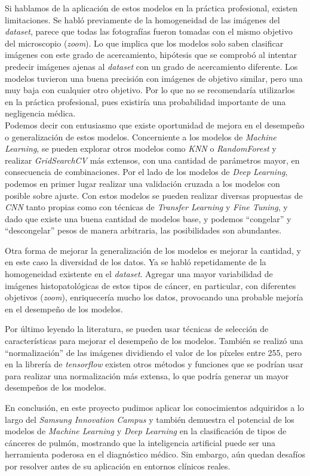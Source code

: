 Si hablamos de la aplicación de estos modelos en la práctica profesional, existen limitaciones. Se habló previamente de la homogeneidad de las imágenes del \textit{dataset}, parece que todas las fotografías fueron tomadas con el mismo objetivo del microscopio (\textit{zoom}). Lo que implica que los modelos solo saben clasificar imágenes con este grado de acercamiento, hipótesis que se comprobó al intentar predecir imágenes ajenas al \textit{dataset} con un grado de acercamiento diferente. Los modelos tuvieron una buena precisión con imágenes de objetivo similar, pero una muy baja con cualquier otro objetivo. Por lo que no se recomendaría utilizarlos en la práctica profesional, pues existiría una probabilidad importante de una negligencia médica. \\

Podemos decir con entusiasmo que existe oportunidad de mejora en el desempeño o generalización de estos modelos. Concerniente a los modelos de \textit{Machine Learning}, se pueden explorar otros modelos como \textit{KNN} o \textit{RandomForest} y realizar \textit{GridSearchCV} más extensos, con una cantidad de parámetros mayor, en consecuencia de combinaciones. Por el lado de los modelos de \textit{Deep Learning}, podemos en primer lugar realizar una validación cruzada a los modelos con posible sobre ajuste. Con estos modelos se pueden realizar diversas propuestas de \textit{CNN} tanto propias como con técnicas de \textit{Transfer Learning} y \textit{Fine Tuning}, y dado que existe una buena cantidad de modelos base, y podemos ``congelar'' y ``descongelar'' pesos de manera arbitraria, las posibilidades son abundantes.

Otra forma de mejorar la generalización de los modelos es mejorar la cantidad, y en este caso la diversidad de los datos. Ya se habló repetidamente de la homogeneidad existente en el \textit{dataset}. Agregar una mayor variabilidad de imágenes histopatológicas de estos tipos de cáncer, en particular, con diferentes objetivos (\textit{zoom}), enriquecería mucho los datos, provocando una probable mejoría en el desempeño de los modelos. 

Por último leyendo la literatura, se pueden usar técnicas de selección de características para mejorar el desempeño de los modelos. También se realizó una ``normalización'' de las imágenes dividiendo el valor de los píxeles entre 255, pero en la librería de \textit{tensorflow} existen otros métodos y funciones que se podrían usar para realizar una normalización más extensa, lo que podría generar un mayor desempeños de los modelos. \\

\newpage

En conclusión, en este proyecto pudimos aplicar los conocimientos adquiridos a lo largo del \textit{Samsung Innovation Campus} y también demuestra el potencial de los modelos de \textit{Machine Learning} y \textit{Deep Learning} en la clasificación de tipos de cánceres de pulmón, mostrando que la inteligencia artificial puede ser una herramienta poderosa en el diagnóstico médico. Sin embargo, aún quedan desafíos por resolver antes de su aplicación en entornos clínicos reales.\\